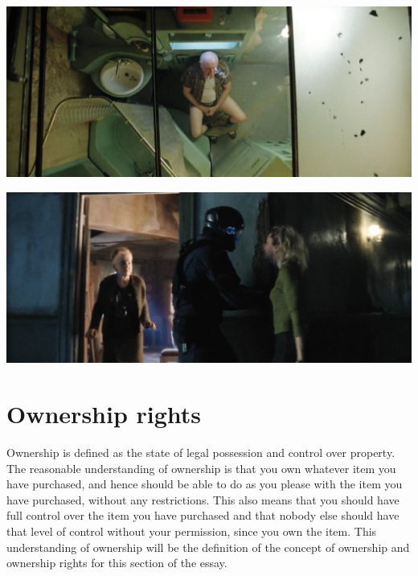 \documentclass[11pt]{article}
\begin{document}
\begin{center}
\includegraphics[width=.9\linewidth]{./images/man-getting-his-iris-scanned-while-on-the-toilet.png}
\end{center}


\begin{center}
\includegraphics[width=.9\linewidth]{./images/resident-complaining-about-the-spider-robots.png}
\end{center}

\section{Ownership rights}
\label{sec:org3f6e753}
Ownership is defined as the state of legal possession and control over
property. The reasonable understanding of ownership is that you own
whatever item you have purchased, and hence should be able to
do as you please with the item you have purchased, without any
restrictions. This also means that you should have full control over
the item you have purchased and that nobody else should have that
level of control without your permission, since you own the item.
This understanding of ownership will be the definition of the concept
of ownership and ownership rights for this section of the essay.
\end{document}

